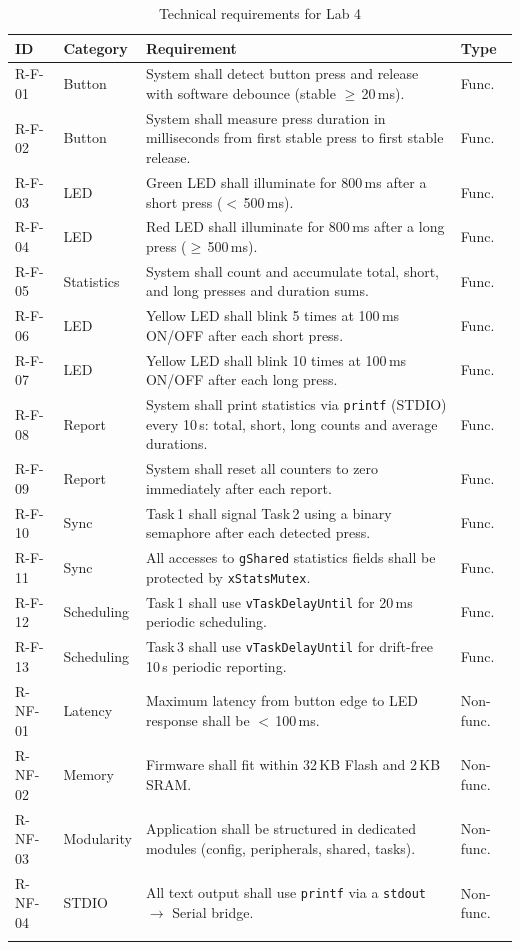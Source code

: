\documentclass[12pt]{article}
\begin{document}
\begin{longtable}{p{1.5cm} p{2.5cm} p{7.5cm} p{1.5cm}}
\toprule
\textbf{ID} & \textbf{Category} & \textbf{Requirement} & \textbf{Type} \\
\midrule
\endfirsthead
R-F-01 & Button & System shall detect button press and release with software debounce (stable $\geq$\,20\,ms). & Func. \\
R-F-02 & Button & System shall measure press duration in milliseconds from first stable press to first stable release. & Func. \\
R-F-03 & LED & Green LED shall illuminate for 800\,ms after a short press ($<$\,500\,ms). & Func. \\
R-F-04 & LED & Red LED shall illuminate for 800\,ms after a long press ($\geq$\,500\,ms). & Func. \\
R-F-05 & Statistics & System shall count and accumulate total, short, and long presses and duration sums. & Func. \\
R-F-06 & LED & Yellow LED shall blink 5 times at 100\,ms ON/OFF after each short press. & Func. \\
R-F-07 & LED & Yellow LED shall blink 10 times at 100\,ms ON/OFF after each long press. & Func. \\
R-F-08 & Report & System shall print statistics via \texttt{printf} (STDIO) every 10\,s: total, short, long counts and average durations. & Func. \\
R-F-09 & Report & System shall reset all counters to zero immediately after each report. & Func. \\
R-F-10 & Sync & Task\,1 shall signal Task\,2 using a binary semaphore after each detected press. & Func. \\
R-F-11 & Sync & All accesses to \texttt{gShared} statistics fields shall be protected by \texttt{xStatsMutex}. & Func. \\
R-F-12 & Scheduling & Task\,1 shall use \texttt{vTaskDelayUntil} for 20\,ms periodic scheduling. & Func. \\
R-F-13 & Scheduling & Task\,3 shall use \texttt{vTaskDelayUntil} for drift-free 10\,s periodic reporting. & Func. \\
R-NF-01 & Latency & Maximum latency from button edge to LED response shall be $<$\,100\,ms. & Non-func. \\
R-NF-02 & Memory & Firmware shall fit within 32\,KB Flash and 2\,KB SRAM. & Non-func. \\
R-NF-03 & Modularity & Application shall be structured in dedicated modules (config, peripherals, shared, tasks). & Non-func. \\
R-NF-04 & STDIO & All text output shall use \texttt{printf} via a \texttt{stdout} $\rightarrow$ Serial bridge. & Non-func. \\
\bottomrule
\caption{Technical requirements for Lab 4}
\label{tab:requirements}
\end{longtable}
\end{document}
